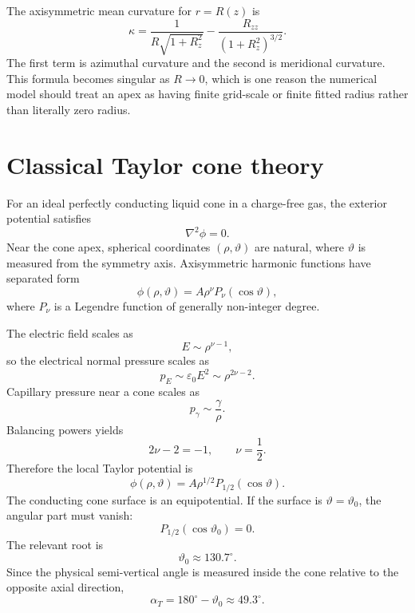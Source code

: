 \documentclass[11pt]{article}
\newcommand{\eps}{\varepsilon}
\begin{document}
The axisymmetric mean curvature for \(r=R(z)\) is
\begin{equation}
    \kappa
    =
    \frac{1}{R\sqrt{1+R_z^2}}
    -
    \frac{R_{zz}}{(1+R_z^2)^{3/2}}.
    \label{eq:curvature_graph}
\end{equation}
The first term is azimuthal curvature and the second is meridional curvature. This formula becomes singular as \(R\to 0\), which is one reason the numerical model should treat an apex as having finite grid-scale or finite fitted radius rather than literally zero radius.

\section{Classical Taylor cone theory}
\label{sec:taylor}

For an ideal perfectly conducting liquid cone in a charge-free gas, the exterior potential satisfies
\begin{equation}
    \nabla^2\phi=0.
\end{equation}
Near the cone apex, spherical coordinates \((\rho,\vartheta)\) are natural, where \(\vartheta\) is measured from the symmetry axis. Axisymmetric harmonic functions have separated form
\begin{equation}
    \phi(\rho,\vartheta)=A\rho^\nu P_\nu(\cos\vartheta),
    \label{eq:separated_taylor}
\end{equation}
where \(P_\nu\) is a Legendre function of generally non-integer degree.

The electric field scales as
\begin{equation}
    E\sim \rho^{\nu-1},
\end{equation}
so the electrical normal pressure scales as
\begin{equation}
    p_E\sim \eps_0E^2\sim \rho^{2\nu-2}.
\end{equation}
Capillary pressure near a cone scales as
\begin{equation}
    p_\gamma\sim \frac{\gamma}{\rho}.
\end{equation}
Balancing powers yields
\begin{equation}
    2\nu-2=-1,
    \qquad
    \nu=\frac12.
\end{equation}
Therefore the local Taylor potential is
\begin{equation}
    \phi(\rho,\vartheta)=A\rho^{1/2}P_{1/2}(\cos\vartheta).
\end{equation}
The conducting cone surface is an equipotential. If the surface is \(\vartheta=\vartheta_0\), the angular part must vanish:
\begin{equation}
    P_{1/2}(\cos\vartheta_0)=0.
    \label{eq:taylor_root}
\end{equation}
The relevant root is
\begin{equation}
    \vartheta_0\approx 130.7^\circ.
\end{equation}
Since the physical semi-vertical angle is measured inside the cone relative to the opposite axial direction,
\begin{equation}
    \alpha_T=180^\circ-\vartheta_0\approx 49.3^\circ.
\end{equation}
\end{document}
